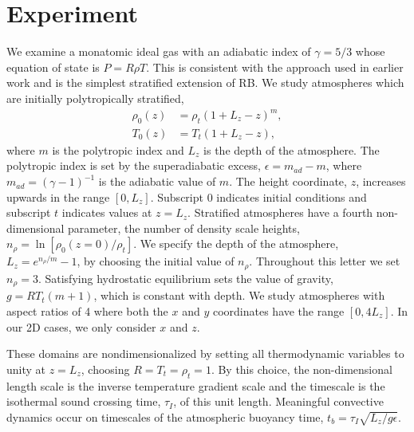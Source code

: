 \documentclass[aps, prl, twocolumn, nofootinbib, groupedaddress, amsfonts, amssymb, amsmath]{revtex4-1}
\begin{document}
\section{Experiment} 
\label{sec:experiment}
We examine a monatomic ideal gas with an adiabatic index of
$\gamma = 5/3$ whose equation of state is $P = R\rho T$. This is consistent with the approach used in earlier work 
\cite{graham1975, chan&all1982, brandenburg&all2005,
hurlburt&all1984, cattaneo&all1990, cattaneo&all1991, brummell&all1996} 
and is the simplest stratified extension of RB.
We study atmospheres which are initially polytropically stratified,
\begin{equation}
\begin{split}
\rho_0(z) &= \rho_{t}(1 + L_z - z)^m, \\
T_0(z)    &= T_{t}(1 + L_z - z),
\label{eqn:polytrope}
\end{split}
\end{equation}
where $m$ is the polytropic index and $L_z$ is the depth of the atmosphere.
The polytropic
index is set by the superadiabatic excess, $\epsilon = m_{ad} - m$, where
$m_{ad} = (\gamma - 1)^{-1}$ is the adiabatic value of $m$.
The height coordinate, $z$, increases upwards in the range $[0, L_z]$.
Subscript 0 indicates initial conditions and subscript $t$ indicates values
at $z = L_z$.   Stratified atmospheres have a fourth non-dimensional parameter,
the number of density scale heights, $n_{\rho} = \ln\left[\rho_0(z=0)/\rho_t\right]$.  We
specify the depth of the atmosphere, $L_z = e^{n_{\rho}/m} - 1$, by choosing
the initial value of $n_{\rho}$.
Throughout this letter we set $n_{\rho} = 3$.    Satisfying hydrostatic
equilibrium sets the value of gravity, $g = RT_t (m + 1)$, which is
constant with depth.  We study atmospheres with aspect
ratios of 4 where both the $x$ and $y$ coordinates have the range $[0, 4L_z]$.
In our 2D cases, we only consider $x$ and $z$.

These domains are nondimensionalized by setting
all thermodynamic variables to unity at $z = L_z$, choosing
$R = T_t = \rho_t = 1$.  By this choice, the non-dimensional
length scale is the inverse temperature gradient scale and the 
timescale is the isothermal sound crossing time, 
$\tau_I$, of this unit length.
Meaningful convective dynamics occur on 
timescales of the atmospheric buoyancy time,
$t_b = \tau_I \sqrt{L_z/g\epsilon}$. 
\end{document}
